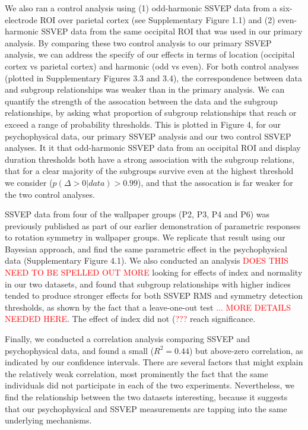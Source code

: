 \documentclass[9pt,twocolumn,twoside,lineno]{pnas-new}
\begin{document}
We also ran a control analysis using (1) odd-harmonic SSVEP data from a six-electrode ROI over parietal cortex (see Supplementary Figure 1.1) and (2) even-harmonic SSVEP data from the same occipital ROI that was used in our primary analysis. By comparing these two control analysis to our primary SSVEP analysis, we can address the specify of our effects in terms of location (occipital cortex vs parietal cortex) and harmonic (odd vs even). For both control analyses (plotted in Supplementary Figures 3.3 and 3.4), the correspondence between data and subgroup relationships was weaker than in the primary analysis. We can quantify the strength of the assocation between the data and the subgroup relationships, by asking what proportion of subgroup relationships that reach or exceed a range of probability thresholds. This is plotted in Figure 4, for our psychophysical data, our primary SSVEP analysis and our two control SSVEP analyses. It it that odd-harmonic SSVEP data from an occipital ROI and display duration thresholds both have a strong association with the subgroup relations, that for a clear majority of the subgroups survive even at the highest threshold we consider ($p(\Delta>0|data)>0.99$), and that the assocation is far weaker for the two control analyses.

SSVEP data from four of the wallpaper groups (P2, P3, P4 and P6) was previously published as part of our earlier demonstration of parametric responses to rotation symmetry in wallpaper groups\cite{RN1725}. We replicate that result using our Bayesian approach, and find the same parametric effect in the psychophysical data (Supplementary Figure 4.1). We also conducted an analysis \textcolor{red}{DOES THIS NEED TO BE SPELLED OUT MORE} looking for effects of index and normality in our two datasets, and found that subgroup relationships with higher indices tended to produce stronger effects for both SSVEP RMS and symmetry detection thresholds, as shown by the fact that a leave-one-out test \textcolor{red}{... MORE DETAILS NEEDED HERE}. The effect of index did not (\textcolor{red}{???} reach significance.  

Finally, we conducted a correlation analysis comparing SSVEP and psychophysical data, and found a small ($R^2 = 0.44$) but above-zero correlation, as indicated by our confidence intervals. There are several factors that might explain the relatively weak correlation, most prominently the fact that the same individuals did not participate in each of the two experiments. Nevertheless, we find the relationship between the two datasets interesting, because it suggests that our psychophysical and SSVEP measurements are tapping into the same underlying mechanisms. 
\end{document}
